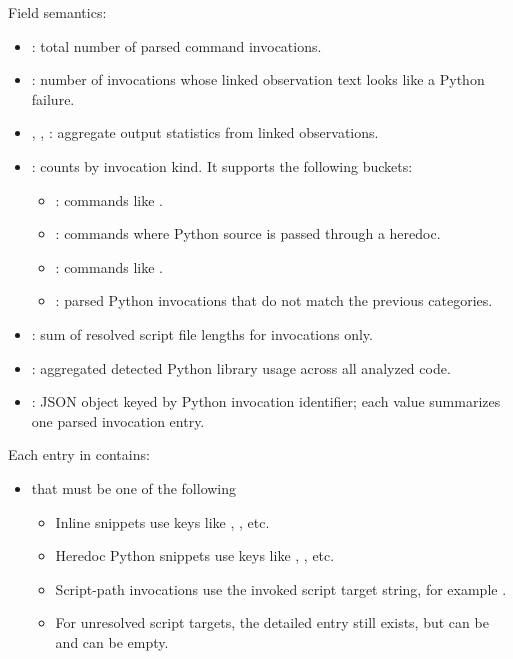 \documentclass[11pt]{article}
\begin{document}
Field semantics:
\begin{itemize}
\item {}: total number of parsed  command invocations.
\item {}: number of invocations whose linked observation text looks like a Python failure.
\item {}, , : aggregate output statistics from linked observations.
\item {}: counts by invocation kind. It supports the following buckets:
\begin{itemize}
\item {}: commands like .
\item {}: commands where Python source is passed through a heredoc.
\item {}: commands like .
\item {}: parsed Python invocations that do not match the previous categories.
\end{itemize}

\item {}: sum of resolved script file lengths for  invocations only.
\item {}: aggregated detected Python library usage across all analyzed code.
\item {}: JSON object keyed by Python invocation identifier; each value summarizes one parsed invocation entry.
\end{itemize}

Each entry in  contains:
\begin{itemize}
\item {} that must be one of the following
  \begin{itemize}
  \item Inline  snippets use keys like , , etc.
  \item Heredoc Python snippets use keys like , , etc.
  \item Script-path invocations use the invoked script target string, for example .
  \item For unresolved script targets, the detailed entry still exists, but  can be  and  can be empty.
  \end{itemize}
\end{itemize}
\end{document}
